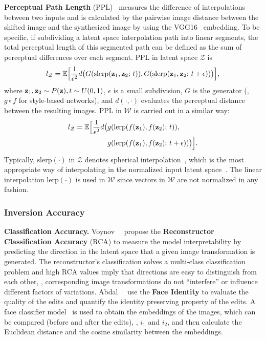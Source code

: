 \vspace{1mm}
\noindent\textbf{Perceptual Path Length} (PPL)~\cite{karras2019style} measures the difference of interpolations between two inputs and is calculated by the pairwise image distance between the shifted image and the synthesized image by using the VGG16~\cite{simonyan2014very} embedding. 
To be specific, if subdividing a latent space interpolation path into linear segments, the total perceptual length of this segmented path can be defined as the sum of perceptual differences over each segment.
PPL in latent space $\mathcal{Z}$ is 
\begin{equation}
l_{\mathcal{Z}} = \mathbb{E}\Big[{\displaystyle\frac{1}{\epsilon^2}}d\big(G(\mathrm{slerp}({\mathbf{z}}_1,{\mathbf{z}}_2;\,t)), G(\mathrm{slerp}({\mathbf{z}}_1,{\mathbf{z}}_2;\,t+\epsilon))\big)\Big],
\end{equation}
where \mbox{${\mathbf{z}}_1,\mathbf{z}_2\sim P(\mathbf{z}),t\sim U(0,1)$}, $\epsilon$ is a small subdivision, $G$ is the generator (\ie, $g \circ f$ for style-based networks), and $d(\cdot,\cdot)$ evaluates the perceptual distance between the resulting images. 
PPL in $\mathcal{W}$ is carried out in a similar way:
\begin{equation}
\begin{aligned}
l_{\mathcal{Z}} = \mathbb{E}\Big[{\displaystyle\frac{1}{\epsilon^2}}d\big(&g(\mathrm{lerp}(f(\mathbf{z}_1),f(\mathbf{z}_2);\,t)), \\
&g(\mathrm{lerp}(f(\mathbf{z}_1),f(\mathbf{z}_2);\,t+\epsilon))\big)\Big].
\end{aligned}
\end{equation}
Typically, $\mathrm{slerp}(\cdot)$ in $\mathcal{Z}$ denotes spherical interpolation~\cite{shoemake1985animating}, which is the most appropriate way of interpolating in the normalized input latent space~\cite{white2016sampling}.
The linear interpolation $\mathrm{lerp}(\cdot)$ is used in $\mathcal{W}$ since vectors in $\mathcal{W}$ are not normalized in any fashion.

\subsubsection{Inversion Accuracy}
\noindent\textbf{Classification Accuracy.}
Voynov~\etal~\cite{voynov2020latent} propose the \textbf{Reconstructor Classification Accuracy} (RCA) to measure the model interpretability by predicting the direction in the latent space that a given image transformation is generated. 
The reconstructor’s classification solves a multi-class classification problem and high RCA values imply that directions are easy to distinguish from each other, \ie, corresponding image transformations do not ``interfere'' or influence different factors of variations.
Abdal~\etal~\cite{abdal2020styleflow} use the \textbf{Face Identity} to evaluate the quality of the edits and quantify the identity preserving property of the edits. 
A face classifier model~\cite{Geitgey2020Fr} is used to obtain the embeddings of the images, which can be compared (before and after the edits), \ie, $i_1$ and $i_2$, and then calculate the Euclidean distance and the cosine similarity between the embeddings.\par

